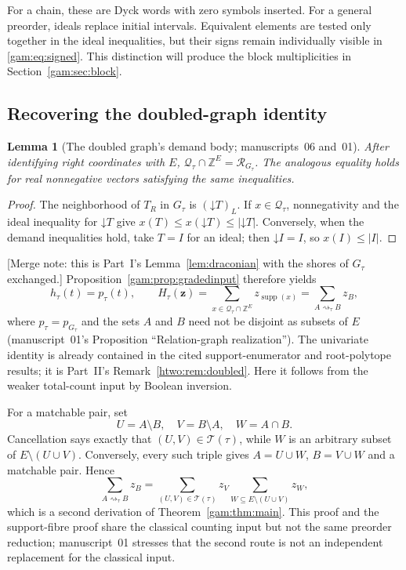 \documentclass[11pt]{article}
\numberwithin{equation}{section}
\newtheorem{lemma}[theorem]{Lemma}
\theoremstyle{definition}
\newcommand{\Z}{\mathbb Z}
\newcommand{\Qt}{\mathcal Q_\tau}
\newcommand{\supp}{\operatorname{supp}}
\newcommand{\down}{\mathord\downarrow}
\newcommand{\zv}{\mathbf z}
\newcommand{\Tset}{\mathcal T}
\newcommand{\match}{\rightsquigarrow}
\begin{document}
For a chain, these are Dyck words with zero symbols inserted. For a general
preorder, ideals replace initial intervals. Equivalent elements are tested
only together in the ideal inequalities, but their signs remain individually
visible in \eqref{gam:eq:signed}. This distinction will produce the block
multiplicities in Section~\ref{gam:sec:block}.

\subsection{Recovering the doubled-graph identity}
\begin{lemma}[The doubled graph's demand body; manuscripts~06 and~01]\label{gam:lem:fullgraph}
After identifying right coordinates with $E$,
$\Qt\cap\Z^E=\mathcal R_{G_\tau}$. The analogous equality holds for real
nonnegative vectors satisfying the same inequalities.
\end{lemma}
\begin{proof}
The neighborhood of $T_R$ in $G_\tau$ is $(\down T)_L$. If $x\in\Qt$,
nonnegativity and the ideal inequality for $\down T$ give
$x(T)\le x(\down T)\le|\down T|$. Conversely, when the demand inequalities
hold, take $T=I$ for an ideal; then $\down I=I$, so $x(I)\le |I|$.
\end{proof}
[Merge note: this is Part~I's Lemma~\ref{lem:draconian} with the shores of
$G_\tau$ exchanged.] Proposition~\ref{gam:prop:gradedinput} therefore yields
\begin{equation}
 h_\tau(t)=p_\tau(t),\qquad
 H_\tau(\zv)=\sum_{x\in\Qt\cap\Z^E}z_{\supp(x)}
     =\sum_{A\match_\tau B}z_B,
 \label{gam:eq:doubled}
\end{equation}
where $p_\tau=p_{G_\tau}$ and the sets $A$ and $B$ need not be disjoint as
subsets of $E$ (manuscript~01's Proposition ``Relation-graph
realization''). The univariate identity is already contained in the cited
support-enumerator and root-polytope results; it is Part~II's
Remark~\ref{htwo:rem:doubled}. Here it follows from the weaker total-count
input by Boolean inversion.

For a matchable pair, set
\[
 U=A\setminus B,\quad V=B\setminus A,\quad W=A\cap B.
\]
Cancellation says exactly that $(U,V)\in\Tset(\tau)$, while $W$ is an arbitrary
subset of $E\setminus(U\cup V)$. Conversely, every such triple gives
$A=U\cup W$, $B=V\cup W$ and a matchable pair. Hence
\[
 \sum_{A\match_\tau B}z_B
   =\sum_{(U,V)\in\Tset(\tau)}z_V
        \sum_{W\subseteq E\setminus(U\cup V)}z_W,
\]
which is a second derivation of Theorem~\ref{gam:thm:main}. This proof and the
support-fibre proof share the classical counting input but not the same
preorder reduction; manuscript~01 stresses that the second route is not an
independent replacement for the classical input.
\end{document}
